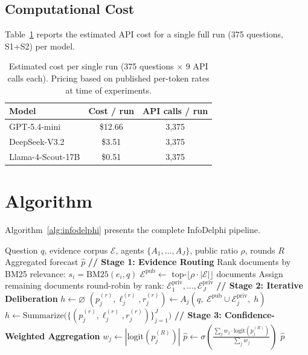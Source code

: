 \documentclass[11pt]{article}
\theoremstyle{plain}
\theoremstyle{definition}
\newcommand{\Epub}{\mathcal{E}^{\mathrm{pub}}}
\newcommand{\Epriv}[1]{\mathcal{E}_{#1}^{\mathrm{priv}}}
\begin{document}
\subsection{Computational Cost}
\label{sec:appendix_cost}

Table~\ref{tab:cost} reports the estimated API cost for a single full run (375 questions, S1+S2) per model.

\begin{table}[h]
\centering
\small
\begin{tabular}{lcc}
\toprule
\textbf{Model} & \textbf{Cost / run} & \textbf{API calls / run} \\
\midrule
GPT-5.4-mini & \$12.66 & 3{,}375 \\
DeepSeek-V3.2 & \$3.51 & 3{,}375 \\
Llama-4-Scout-17B & \$0.51 & 3{,}375 \\
\bottomrule
\end{tabular}
\caption{Estimated cost per single run (375 questions $\times$ 9 API calls each). Pricing based on published per-token rates at time of experiments.}
\label{tab:cost}
\end{table}

\section{Algorithm}
\label{sec:appendix_algorithm}

Algorithm~\ref{alg:infodelphi} presents the complete InfoDelphi pipeline.

\begin{algorithm}[H]
\caption{InfoDelphi: Multi-Agent Forecasting with Designed Information Asymmetry}
\label{alg:infodelphi}
\begin{algorithmic}[1]
\REQUIRE Question $q$, evidence corpus $\mathcal{E}$, agents $\{A_1, \dots, A_J\}$, public ratio $\rho$, rounds $R$
\ENSURE Aggregated forecast $\hat{p}$
\STATE \textbf{// Stage 1: Evidence Routing}
\STATE Rank documents by BM25 relevance: $s_i = \mathrm{BM25}(e_i, q)$
\STATE $\Epub \leftarrow$ top-$\lfloor \rho \cdot |\mathcal{E}| \rfloor$ documents
\STATE Assign remaining documents round-robin by rank: $\Epriv{1}, \dots, \Epriv{J}$
\STATE \textbf{// Stage 2: Iterative Deliberation}
\STATE $h \leftarrow \varnothing$
    \STATE $(p_j^{(r)}, \ell_j^{(r)}, r_j^{(r)}) \leftarrow A_j(q,\; \Epub \cup \Epriv{j},\; h)$
  \ENDFOR
  \STATE $h \leftarrow \mathrm{Summarize}\bigl(\{(p_j^{(r)}, \ell_j^{(r)}, r_j^{(r)})\}_{j=1}^J\bigr)$
\ENDFOR
\STATE \textbf{// Stage 3: Confidence-Weighted Aggregation}
  \STATE $w_j \leftarrow |\mathrm{logit}(p_j^{(R)})|$
\ENDFOR
\STATE $\hat{p} \leftarrow \sigma\!\left(\frac{\sum_j w_j \cdot \mathrm{logit}(p_j^{(R)})}{\sum_j w_j}\right)$
\RETURN $\hat{p}$
\end{algorithmic}
\end{algorithm}
\end{document}
